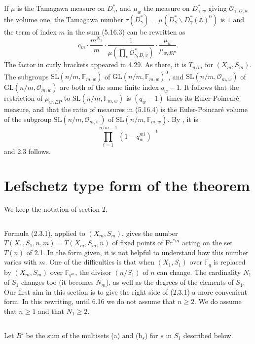 \documentclass[11pt,a4paper]{article}
\theoremstyle{plain}
\theoremstyle{definition}
\newcommand{\Fq}{\mathbb{F}_q}
\newcommand{\F}{\mathbb{F}}
\newcommand{\GL}{\mathrm{GL}}
\newcommand{\SL}{\mathrm{SL}}
\newcommand{\Fr}{\mathrm{Fr}}
\begin{document}
If $\mu$ is the Tamagawa measure on $D_\gamma^*$, and $\mu_w$ the measure on $D_{\gamma,w}^*$ giving $\mathcal{O}_{\gamma,D,w}$ the volume one, the Tamagawa number $\tau(D_\gamma^*) = \mu(D_\gamma^* \backslash D_\gamma^*(\mathbb{A})^0)$ is $1$ and the term of index $m$ in the sum (5.16.3) can be rewritten as
\begin{equation}
c_m \cdot \frac{m^{N_1}}{m} \cdot \frac{1}{\mu(\prod_v \mathcal{O}_{\gamma,D,v}^*)} \cdot \frac{\mu_w}{\mu_{w,EP}}. \tag{5.16.4}
\end{equation}
The factor in curly brackets appeared in 4.29. As there, it is $T_{n/m}$ for $(X_m, S_m)$. The subgroups $\SL(n/m, \mathbb{F}_{m,w})$ of $\GL(n/m, \mathbb{F}_{m,w})^0$, and $\SL(n/m, \mathcal{O}_{m,w})$ of $\GL(n/m, \mathcal{O}_{m,w})$ are both of the same finite index $q_w - 1$. It follows that the restriction of $\mu_{w,EP}$ to $\SL(n/m, \mathbb{F}_{m,w})$ is $(q_w - 1)$ times its Euler-Poincar\'e measure, and that the ratio of measures in (5.16.4) is the Euler-Poincar\'e volume of the subgroup $\SL(n/m, \mathcal{O}_{m,w})$ of $\SL(n/m, \mathbb{F}_{m,w})$. By \cite[Th. 7]{S}, it is
\[
\prod_{i=1}^{n/m-1} (1 - q_w^{mi})^{-1}
\]
and 2.3 follows.

\section{Lefschetz type form of the theorem}

We keep the notation of section 2.

\subsection{}
Formula (2.3.1), applied to $(X_m, S_m)$, gives the number $T(X_1,S_1,n,m) = T(X_m,S_m,n)$ of fixed points of $\Fr^{*m}$ acting on the set $T(n)$ of 2.1. In the form given, it is not helpful to understand how this number varies with $m$. One of the difficulties is that when $(X_1, S_1)$ over $\Fq$ is replaced by $(X_m, S_m)$ over $\F_{q^m}$, the divisor $(n/S_1)$ of $n$ can change. The cardinality $N_1$ of $S_1$ changes too (it becomes $N_m$), as well as the degrees of the elements of $S_1$. Our first aim in this section is to give the right side of (2.3.1) a more convenient form. In this rewriting, until 6.16 we do not assume that $n \geq 2$. We do assume that $n \geq 1$ and that $N_1 \geq 2$.

\subsection{}
Let $B'$ be the sum of the multisets (a) and (b$_s$) for $s$ in $S_1$ described below.
\end{document}
